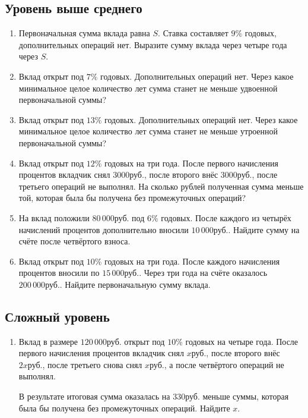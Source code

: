 \documentclass[a4paper,12pt]{article}
\newcommand{\RUB}{\text{руб.}}
\begin{document}
\subsection*{Уровень выше среднего}

\begin{enumerate}[label=\textbf{\arabic*.},resume]

  \item Первоначальная сумма вклада равна \(S\). Ставка составляет \(9\%\)
  годовых, дополнительных операций нет. Выразите сумму вклада через четыре
  года через \(S\).

  \item Вклад открыт под \(7\%\) годовых. Дополнительных операций нет.
  Через какое минимальное целое количество лет сумма станет не меньше
  удвоенной первоначальной суммы?

  \item Вклад открыт под \(13\%\) годовых. Дополнительных операций нет.
  Через какое минимальное целое количество лет сумма станет не меньше
  утроенной первоначальной суммы?

  \item Вклад открыт под \(12\%\) годовых на три года. После первого
  начисления процентов вкладчик снял \(3000\RUB\), после второго внёс
  \(3000\RUB\), после третьего операций не выполнял. На сколько рублей
  полученная сумма меньше той, которая была бы получена без промежуточных
  операций?

  \item На вклад положили \(80\,000\RUB\) под \(6\%\) годовых.
  После каждого из четырёх начислений процентов дополнительно вносили
  \(10\,000\RUB\). Найдите сумму на счёте после четвёртого взноса.

  \item Вклад открыт под \(10\%\) годовых на три года. После каждого
  начисления процентов вносили по \(15\,000\RUB\). Через три года на счёте
  оказалось \(200\,000\RUB\). Найдите первоначальную сумму вклада.

\end{enumerate}

\subsection*{Сложный уровень}

\begin{enumerate}[label=\textbf{\arabic*.},resume]

  \item Вклад в размере \(120\,000\RUB\) открыт под \(10\%\) годовых
  на четыре года. После первого начисления процентов вкладчик снял
  \(x\RUB\), после второго внёс \(2x\RUB\), после третьего снова снял
  \(x\RUB\), а после четвёртого операций не выполнял.

  В результате итоговая сумма оказалась на \(330\RUB\) меньше суммы,
  которая была бы получена без промежуточных операций. Найдите \(x\).

\end{enumerate}
\end{document}
